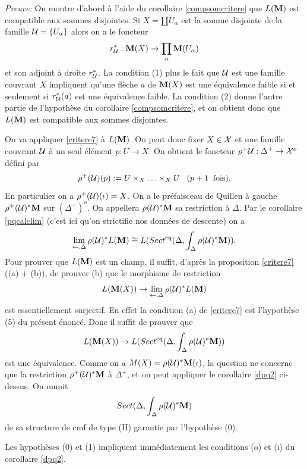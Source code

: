 \documentclass[12pt]{article}
\newcommand{\mm}{{\bf M}}
\newcommand{\Uu}{{\cal U}}
\newcommand{\Xx}{{\cal X}}
\begin{document}
{\em Preuve:}
On montre d'abord \`a l'aide du corollaire \ref{compsomcritere}
que $L(\mm )$ est compatible aux sommes disjointes. Si $X=\amalg U_{\alpha}$
est la somme disjointe de la famille $\Uu = \{ U_{\alpha}\}$ alors
on a le foncteur
$$
r_{\Uu}^{\ast}: \mm (X)\rightarrow \prod _{\alpha} \mm (U_{\alpha})
$$
et son adjoint \`a droite $r_{\Uu}^{\ast}$. La condition (1) plus le fait
que $\Uu$ est une famille couvrant $X$ impliquent qu'une fl\`eche $a$ de
$\mm (X)$ est une \'equivalence faible si et seulement si $r^{\ast}_{\Uu}(a)$
est une \'equivalence faible. La condition (2) donne l'autre  partie de
l'hypoth\`ese du corollaire \ref{compsomcritere},
et on obtient donc que $L(\mm )$
est compatible aux sommes disjointes.

On va appliquer \ref{critere7} \`a $L(\mm )$. On peut donc fixer $X\in \Xx$ et
une famille couvrant $\Uu$ \`a un seul \'el\'ement
$p:U\rightarrow X$.
On obtient le foncteur
$\rho ^+\Uu: \Delta ^+ \rightarrow \Xx
^o$ d\'efini par
$$
\rho ^+(\Uu )(p) := U \times _X \ldots \times _XU \;\;\; (p+1 \;\;
\mbox{fois}).
$$
En particulier
on a $\rho ^+ (\Uu )(\iota ) = X$. On a le pr\'efaisceau de Quillen \`a
gauche $\rho ^+ (\Uu )^{\ast} \mm$ sur $(\Delta ^+)^o$. On appellera
$\rho (\Uu )^{\ast} \mm$ sa restriction \`a $\Delta$. Par le corollaire
\ref{pqcalclim} (c'est ici qu'on strictifie nos donn\'ees de descente) on a
$$
\lim _{\leftarrow , \Delta} \rho (\Uu )^{\ast}L(\mm )
\cong L(Sect ^{\rm eq}(\Delta , \int _{\Delta}\rho (\Uu )^{\ast}\mm )).
$$
Pour prouver que $L(\mm )$ est un champ, il suffit, d'apr\`es la proposition
\ref{critere7} ((a) + (b)), de prouver (b) que le morphisme de restriction
$$
L(\mm (X))\rightarrow \lim _{\leftarrow , \Delta} \rho (\Uu )^{\ast}L(\mm )
$$
est essentiellement surjectif. 
En effet la condition (a) de \ref{critere7}
est l'hypoth\`ese (5) du pr\'esent \'enonc\'e.
Donc il suffit de prouver que
$$
L(\mm (X))\rightarrow
L(Sect ^{\rm eq}(\Delta , \int _{\Delta}\rho (\Uu )^{\ast}\mm ))
$$
est une \'equivalence.
Comme on a $M(X)=\rho (\Uu )^{\ast}\mm (\iota )$, la question ne concerne
que la restriction $\rho ^+(\Uu )^{\ast}\mm$ \`a $\Delta ^+$, et on peut
appliquer le corollaire \ref{dpq2} ci-dessus.
On munit
$$
Sect (\Delta , \int _{\Delta}\rho (\Uu )^{\ast}\mm )
$$
de sa structure de cmf de type (II) garantie par l'hypoth\`ese (0).

Les hypoth\`eses (0) et  (1)  impliquent
imm\'ediatement les conditions (o) et (i) du corollaire \ref{dpq2}.
\end{document}
